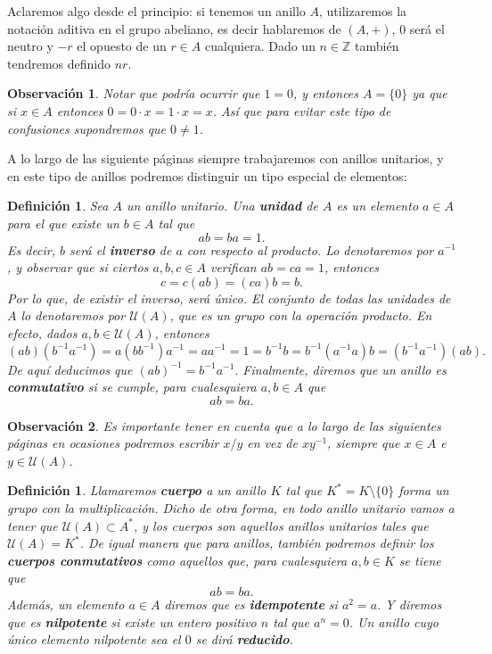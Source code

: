 \documentclass[12pt]{article}
\newtheorem{definition}[theorem]{Definición}
\newtheorem{observation}{Observación}[theorem]
\begin{document}
Aclaremos algo desde el principio: si tenemos un anillo $A$, utilizaremos la notación aditiva en el grupo abeliano, es decir hablaremos de $(A,+)$, $0$ será el neutro y $-r$ el opuesto de un $r \in A$ cualquiera. Dado un $n \in \mathbb{Z}$ también tendremos definido $nr$.

\begin{observation} Notar que podría ocurrir que $1 = 0$, y entonces $A = \lbrace 0 \rbrace$ ya que si $x \in A$ entonces $0 =  0 \cdot x = 1 \cdot x = x$. Así que para evitar este tipo de confusiones supondremos que $0 \neq 1$.
\end{observation}

A lo largo de las siguiente páginas siempre trabajaremos con anillos unitarios, y en este tipo de anillos podremos distinguir un tipo especial de elementos: 

\begin{definition}Sea $A$ un anillo unitario. Una \textbf{unidad} de $A$ es un elemento $a \in A$ para el que existe un $b \in A$ tal que $$ab = ba = 1.$$ Es decir, $b$ será el \textbf{inverso} de $a$ con respecto al producto. Lo denotaremos por $a^{-1}$, y observar que si ciertos $a, b, c \in A$ verifican $ab = ca = 1$, entonces $$c = c(ab) = (ca)b = b.$$ Por lo que, de existir el inverso, será único. El conjunto de todas las unidades de $A$ lo denotaremos por $\mathcal{U}(A)$, que es un grupo con la operación producto. En efecto, dados $a,b \in \mathcal{U}(A)$, entonces $$(ab)(b^{-1}a^{-1}) = a(bb^{-1})a^{-1} = aa^{-1} = 1 = b^{-1}b = b^{-1}(a^{-1}a)b = (b^{-1}a^{-1})(ab).$$ De aquí deducimos que $(ab)^{-1} = b^{-1}a^{-1}.$ Finalmente, diremos que un anillo es \textbf{conmutativo} si se cumple, para cualesquiera $a,b \in A$ que $$ab = ba.$$
\end{definition}

\begin{observation}Es importante tener en cuenta que a lo largo de las siguientes páginas en ocasiones podremos escribir $x/y$ en vez de $xy^{-1}$, siempre que $x \in A$ e $y \in \mathcal{U}(A)$.
\end{observation}

\begin{definition} Llamaremos \textbf{cuerpo} a un anillo $K$ tal que $K^{\ast} = K \setminus \lbrace 0 \rbrace$ forma un grupo con la multiplicación. Dicho de otra forma, en todo anillo unitario vamos a tener que $\mathcal{U}(A) \subset A^{\ast}$, y los cuerpos son aquellos anillos unitarios tales que $\mathcal{U}(A) = K^{\ast}$. De igual manera que para anillos, también podremos definir los \textbf{cuerpos conmutativos} como aquellos que, para cualesquiera $a,b \in K$ se tiene que $$ab = ba.$$
Además, un elemento $a \in A$ diremos que es \textbf{idempotente} si $a^{2} = a$. Y diremos que es \textbf{nilpotente} si existe un entero positivo $n$ tal que $a^{n} = 0$. Un anillo cuyo único elemento nilpotente sea el $0$ se dirá \textbf{reducido}.
\end{definition}
\end{document}
